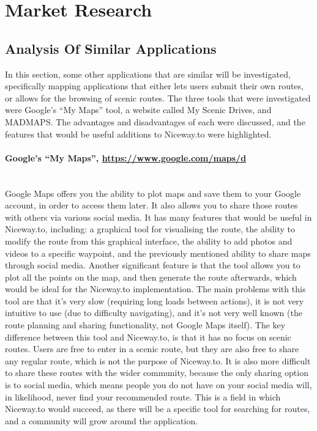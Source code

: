 \section{Market Research}
\subsection{Analysis Of Similar Applications}
In this section, some other applications that are similar will be investigated, specifically mapping applications that either lets users submit their own routes, or allows for the browsing of scenic routes. The three tools that were investigated were Google's ``My Maps'' tool, a website called My Scenic Drives, and MADMAPS. The advantages and disadvantages of each were discussed, and the features that would be useful additions to Niceway.to were highlighted.

\paragraph{Google's ``My Maps'', \url{https://www.google.com/maps/d}}\ \\
Google Maps offers you the ability to plot maps and save them to your Google account, in order to access them later. It also allows you to share those routes with others via various social media. It has many features that would be useful in Niceway.to, including: a graphical tool for visualising the route, the ability to modify the route from this graphical interface, the ability to add photos and videos to a specific waypoint, and the previously mentioned ability to share maps through social media. Another significant feature is that the tool allows you to plot all the points on the map, and then generate the route afterwards, which would be ideal for the Niceway.to implementation. The main problems with this tool are that it's very slow (requiring long loads between actions), it is not very intuitive to use (due to difficulty navigating), and it's not very well known (the route planning and sharing functionality, not Google Maps itself). The key difference between this tool and Niceway.to, is that it has no focus on scenic routes. Users are free to enter in a scenic route, but they are also free to share any regular route, which is not the purpose of Niceway.to. It is also more difficult to share these routes with the wider community, because the only sharing option is to social media, which means people you do not have on your social media will, in likelihood, never find your recommended route. This is a field in which Niceway.to would succeed, as there will be a specific tool for searching for routes, and a community will grow around the application. 

